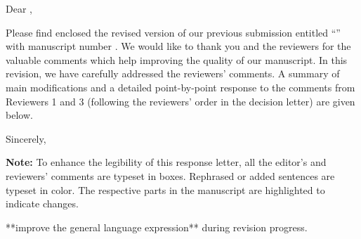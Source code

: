 Dear \editorname,

Please find enclosed the revised version of our previous submission entitled \enquote{\thetitle} with manuscript number \manuscript. We would like to thank you and the reviewers for the valuable comments which help improving the quality of our manuscript.
In this revision, we have carefully addressed the reviewers' comments. A summary of main modifications and a detailed point-by-point response to the comments from Reviewers 1 and 3 (following the reviewers' order in the decision letter) are given below.

\vspace{1.2em}

Sincerely,

\vspace{1.5em}

\theauthor

\vfil
\textbf{Note:} To enhance the legibility of this response letter, all the editor's and reviewers' comments are typeset in boxes. Rephrased or added sentences are typeset in color. The respective parts in the manuscript are highlighted to indicate changes.


**improve the general language expression** during revision progress.